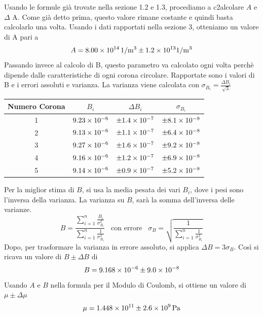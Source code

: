 \documentclass[a4paper]{article}
\begin{document}
Usando le formule già trovate nella sezione 1.2 e 1.3, procediamo a c2alcolare $A$ e $\Delta$ A. Come già detto prima, questo valore rimane costante e quindi basta calcolarlo una volta. Usando i dati rapportati nella sezione 3, otteniamo un valore di A pari a 
\begin{equation}
    A = \SI{8.00E14}{1/m^3} \pm{\SI{1.2E13}{}} \SI{}{1/m^3}
\end{equation}
Passando invece al calcolo di B, questo parametro va calcolato ogni volta perchè dipende dalle caratteristiche di ogni corona circolare. Rapportate sono i valori di B e i errori assoluti e varianza. La varianza viene calcolata con $\sigma_{B_{i}}= \frac{\Delta B_i}{\sqrt{3}}$
\begin{table}[!ht]
    \centering
    \begin{tabular}{|c|c|c|c|}
        \hline
        Numero Corona & $B_i$ & $\Delta B_i$ & $\sigma_{B_{i}}$ \\
        \hline
        1 & $\SI{9.23E-6}{}$ & $\pm{\SI{1.4E-7}{}}$ & $\pm{\SI{8.1E-8}{}}$ \\
        2 & $\SI{9.13E-6}{}$ & $\pm{\SI{1.1E-7}{}}$ & $\pm{\SI{6.4E-8}{}}$\\
        3 & $\SI{9.27E-6}{}$ & $\pm{\SI{1.6E-7}{}}$ & $\pm{\SI{9.2E-8}{}}$\\
        4 & $\SI{9.16E-6}{}$ & $\pm{\SI{1.2E-7}{}}$ & $\pm{\SI{6.9E-8}{}}$\\
        5 & $\SI{9.14E-6}{}$ & $\pm{\SI{0.9E-7}{}}$ & $\pm{\SI{5.2E-8}{}}$\\
        \hline
    \end{tabular}
\end{table}
Per la miglior stima di $B$, si usa la media pesata dei vari $B_i$, dove i pesi sono l'inversa della varianza. La varianza su $B$, sarà la somma dell'inversa delle varianze. 
\begin{equation}
    B = \frac{\sum_{i = 1}^{n} \frac{B_i}{\sigma_{B_{i}}^2}}{\sum_{i = 1}^{n}\frac{1}{\sigma_{B_{i}}^2}} \; \; \; \text{con errore} \; \; \; \sigma_{B} = \sqrt{\frac{1}{\sum_{i =1}^{n}\frac{1}{\sigma_{B_{i}}^2}}}
\end{equation}
Dopo, per trasformare la varianza in errore assoluto, si applica $\Delta B = 3\sigma_B$. Così si ricava un valore di $B\pm{\Delta B}$ di 
\begin{equation}
    B = \SI{9.168E-6}{}\pm{\SI{9.0E-8}{}} 
\end{equation}
Usando $A$ e $B$ nella formula per il Modulo di Coulomb, si ottiene un valore di $\mu \pm{\Delta \mu}$ 
\begin{equation}
    \mu = \SI{1.448E11}{} \pm{\SI{2.6E9}{Pa}}
\end{equation}
\end{document}
